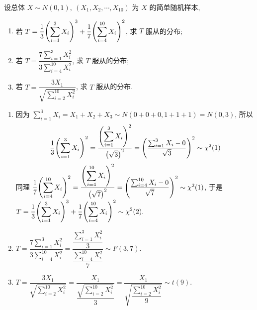 \begin{example}
    设总体 $X\sim N(0,1),~(X_1,X_2,\cdots,X_{10})$ 为 $X$ 的简单随机样本, 
    \begin{enumerate}[label=(\arabic{*})]
        \item 若 $T=\displaystyle\dfrac{1}{3}\qty(\sum_{i=1}^{3}X_i)^3+\dfrac{1}{7}\qty(\sum_{i=4}^{10}X_i)^2$, 求 $T$ 服从的分布;
        \item 若 $T=\dfrac{\displaystyle7\sum_{i=1}^{3}X_i^2}{\displaystyle 3\sum_{i=4}^{10}X_i^2}$, 求 $T$ 服从的分布;
        \item 若 $T=\dfrac{3X_1}{\sqrt{\displaystyle\sum_{i=2}^{10}X_i^2}}$, 求 $T$ 服从的分布.
    \end{enumerate}
\end{example}
\begin{solution}
    \begin{enumerate}[label=(\arabic{*})]
        \item 因为 $\displaystyle\sum_{i=1}^{3}X_i=X_1+X_2+X_3\sim N(0+0+0,1+1+1)=N(0,3)$, 所以
              $$\dfrac{1}{3}\qty(\sum_{i=1}^{3}X_i)^2=\dfrac{\displaystyle\qty(\sum_{i=1}^{3}X_i)^2}{\qty(\sqrt{3})^2}=\qty(\dfrac{\sum_{i=1}^{3}X_i-0}{\sqrt{3}})^2\sim \chi^2(1)$$
              同理 $\dfrac{1}{7}\qty(\displaystyle\sum_{i=4}^{10}X_i)^2=\dfrac{\qty(\displaystyle\sum_{i=4}^{10}X_i)^2}{\qty(\sqrt{7})^2}=\qty(\dfrac{\sum_{i=4}^{10}X_i-0}{\sqrt{7}})^2\sim\chi^2(1)$, 
              于是 $T=\displaystyle\dfrac{1}{3}\qty(\sum_{i=1}^{3}X_i)^3+\dfrac{1}{7}\qty(\sum_{i=4}^{10}X_i)^2\sim\chi^2(2).$
        \item $T=\dfrac{\displaystyle7\sum_{i=1}^{3}X_i^2}{\displaystyle 3\sum_{i=4}^{10}X_i^2}=\dfrac{\dfrac{\sum_{i=1}^{3}X_i^2}{3}}{\dfrac{\sum_{i=4}^{10}X_i^2}{7}}\sim F(3,7).$
        \item $T=\dfrac{3X_1}{\sqrt{\displaystyle\sum_{i=2}^{10}X_i^2}}=\dfrac{X_1}{\dfrac{\sqrt{\sum_{i=2}^{10}X_i^2}}{3}}=\dfrac{X_1}{\sqrt{\dfrac{\sum_{i=2}^{10}X_i^2}{9}}}\sim t(9).$
    \end{enumerate}
\end{solution}

